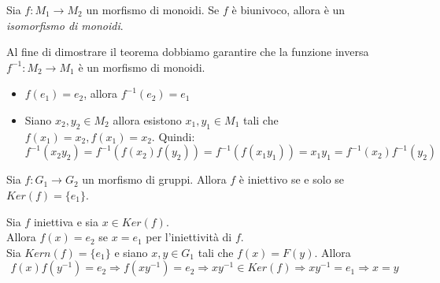         \begin{theorem}
            Sia $f:M_1 \rightarrow M_2$ un morfismo di monoidi. Se $f$ è biunivoco, allora è un \emph{isomorfismo di monoidi}.
        \end{theorem}
        \begin{dimos}
            Al fine di dimostrare il teorema dobbiamo garantire che la funzione inversa $f^{-1}: M_2 \rightarrow M_1$ è un morfismo di monoidi.\\
            \begin{itemize}
                \item $f(e_1) = e_2$, allora $f^{-1}(e_2) = e_1$
                \item Siano $x_2,y_2 \in M_2$ allora esistono $x_1,y_1 \in M_1$ tali che $f(x_1) = x_2, f(x_1) = x_2$. Quindi: $$f^{-1}(x_2y_2) = f^{-1}(f(x_2)f(y_2)) = f^{-1}(f(x_1y_1)) = x_1y_1 = f^{-1}(x_2)f^{-1}(y_2)$$
            \end{itemize}
        \end{dimos}

        \begin{theorem}
            Sia $f: G_1 \rightarrow G_2$ un morfismo di gruppi. Allora $f$ è iniettivo se e solo se $Ker(f) = \{e_1\}$.
        \end{theorem}

        \begin{dimos}
            Sia $f$ iniettiva e sia $x \in Ker(f)$.\\
            Allora $f(x) = e_2$ se $x=e_1$ per l'iniettività di $f$.\\
            Sia $Kern(f) = \{e_1\}$ e siano $x,y \in G_1$ tali che $f(x) = F(y)$. Allora $$f(x)f(y^{-1}) = e_2 \Rightarrow f(xy^{-1}) = e_2 \Rightarrow xy^{-1} \in Ker(f) \Rightarrow xy^{-1} = e_1 \Rightarrow x=y$$
        \end{dimos}

